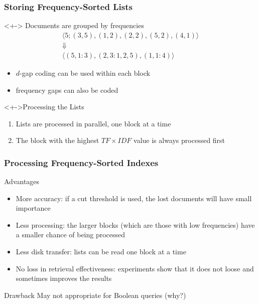 \documentclass[svgnames]{beamer}
\newcommand{\ang}[1]{\ensuremath{\langle #1 \rangle}}
\begin{document}
\begin{frame}
  \frametitle{Storing Frequency-Sorted Lists}

  \begin{block}<+->{}
    Documents are grouped by frequencies
    \begin{multline*}
      \ang{ 5; (3,5), (1,2), (2,2), (5,2), (4,1) } \\
      \Downarrow \\
      \ang{ (5,1: 3), (2,3: 1,2,5), (1,1: 4) }
      \end{multline*}
    \begin{itemize}
    \item $d$-gap coding can be used within each block
    \item frequency gaps can also be coded
    \end{itemize}
  \end{block}

  \begin{block}<+->{Processing the Lists}
    \begin{enumerate}
    \item Lists are processed in parallel, one block at a time
    \item The block with the highest $TF \times IDF$ value is always processed
      first
    \end{enumerate}
  \end{block}

\end{frame}


\begin{frame}
  \frametitle{Processing Frequency-Sorted Indexes}
  
  \begin{block}{Advantages}
    \begin{itemize}
    \item More accuracy: if a cut threshold is used, the lost documents will
      have small importance
    \item Less processing: the larger blocks (which are those with low
      frequencies) have a smaller chance of being processed
    \item Less disk transfer: lists can be read one block at a time
    \item No loss in retrieval effectiveness: experiments show that it does not
      loose and sometimes improves the results
    \end{itemize}
  \end{block}

  \begin{block}{Drawback}
    May not appropriate for Boolean queries (why?)
  \end{block}
\end{frame}
\end{document}
